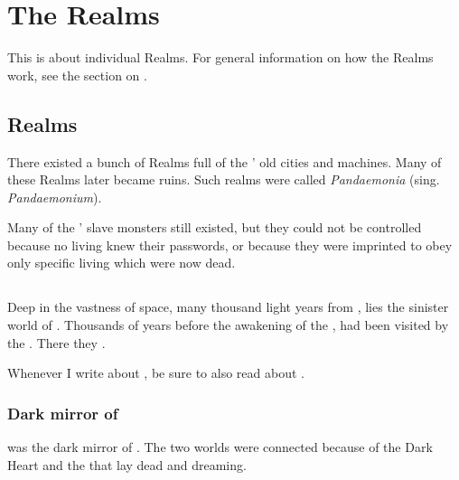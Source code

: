 \chapter{The Realms}
This is about individual Realms. 
For general information on how the Realms work, see the section on . 















\section{\Draconian Realms}
There existed a bunch of Realms full of the \dragons' old cities and machines. 
Many of these Realms later became \wylde ruins. 
Such realms were called \emph{Pandaemonia} (sing. \emph{Pandaemonium}). 

Many of the \dragons' slave monsters still existed, but they could not be controlled because no living \dragons knew their passwords, or because they were imprinted to obey only specific living \dragons which were now dead. 















\section{\Erebos}
\index{\Erebos}
Deep in the vastness of space, many thousand light years from \Miith{}, lies the sinister world of \Erebos{}. 
Thousands of years before the awakening of the \dragons{}, \Erebos{} had been visited by the \voyagers{}. 
There they . 

Whenever I write about \Erebos, be sure to also read about .









\subsection{Dark mirror of \Nyx}
\Erebos was the dark mirror of \Nyx. 
The two worlds were connected because of the Dark Heart and the  that lay dead and dreaming.









